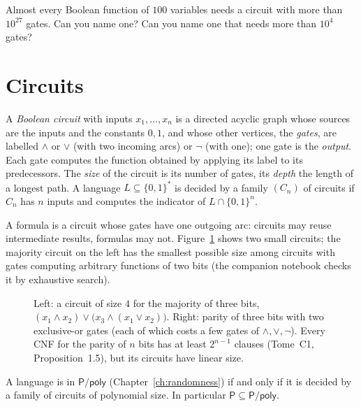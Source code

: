 \begin{think}
Almost every Boolean function of $100$ variables needs a circuit with more than $10^{27}$ gates. Can you name one? Can you name one that needs more than $10^4$ gates?
\end{think}

\section{Circuits}\label{sec:circuits}

\begin{definition}\label{def:circuit}
A \emph{Boolean circuit} with inputs $x_1,\dots,x_n$ is a directed acyclic graph whose sources are the inputs and the constants $0,1$, and whose other vertices, the \emph{gates}, are labelled $\land$ or $\lor$ (with two incoming arcs) or $\lnot$ (with one); one gate is the \emph{output}. Each gate computes the function obtained by applying its label to its predecessors. The \emph{size} of the circuit is its number of gates, its \emph{depth} the length of a longest path. A language $L\subseteq\{0,1\}^*$ is decided by a family $(C_n)$ of circuits if $C_n$ has $n$ inputs and computes the indicator of $L\cap\{0,1\}^n$.
\end{definition}

A formula is a circuit whose gates have one outgoing arc: circuits may reuse intermediate results, formulas may not. Figure~\ref{fig:circuits} shows two small circuits; the majority circuit on the left has the smallest possible size among circuits with gates computing arbitrary functions of two bits (the companion notebook checks it by exhaustive search).

\begin{figure}[ht]
\centering
{}
\caption{Left: a circuit of size $4$ for the majority of three bits, $(x_1\land x_2)\lor\bigl(x_3\land(x_1\lor x_2)\bigr)$. Right: parity of three bits with two exclusive-or gates (each of which costs a few gates of $\land,\lor,\lnot$). Every CNF for the parity of $n$ bits has at least $2^{n-1}$ clauses (Tome~C1, Proposition~1.5), but its circuits have linear size.}
\label{fig:circuits}
\end{figure}

\begin{proposition}\label{prop:ppoly}
A language is in $\mathsf P/\mathsf{poly}$ (Chapter~\ref{ch:randomness}) if and only if it is decided by a family of circuits of polynomial size. In particular $\mathsf P\subseteq\mathsf P/\mathsf{poly}$.
\end{proposition}

